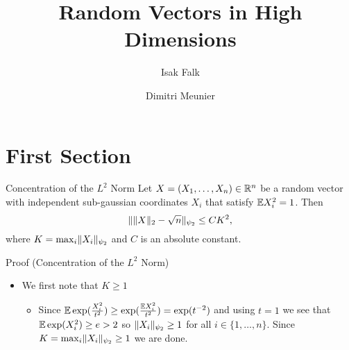 \documentclass{beamer}
\title{Random Vectors in High Dimensions}
\author{Isak Falk \and Dimitri Meunier}
\institute{IIT}
\begin{document}
  \maketitle
  \section{First Section}
  \begin{frame}{Concentration of the \(L^{2}\) Norm}
      Let \(X = (X_{1}, \dots, X_{n}) \in \mathbb{R}^{n}\) be a random vector with independent
      sub-gaussian coordinates \(X_{i}\) that satisfy \(\mathbb{E} X_{i}^{2} = 1\). Then
      \begin{equation}
        \lVert\lVert X\rVert_{2} - \sqrt{n}\rVert_{\psi_{2}} \leq CK^{2},
      \end{equation}
      where \(K = \max_{i} \lVert X_{i}\rVert_{\psi_{2}}\) and \(C\) is an absolute
      constant.
  \end{frame}

  \begin{frame}{Proof (Concentration of the \(L^{2}\) Norm)}
    \begin{itemize}
      \item We first note that \(K \geq 1\)\pause
        \begin{itemize}
          \item Since \(\mathbb{E} \exp(\frac{X_{i}^{2}}{t^{2}}) \geq \exp(\frac{\mathbb{E} X_{i}^{2}}{t^{2}}) = \exp(t^{-2})\)
     and using \(t = 1\) we see that \(\mathbb{E} \exp(X_{i}^{2}) \geq e > 2\) so
     \(\lVert X_{i}\rVert_{\psi_{2}} \geq 1\) for all \(i \in \{1, \dots, n\}\). Since
     \(K = \max_{i}\lVert X_{i}\rVert_{\psi_{2}} \geq 1\) we are done.
        \end{itemize}
    \end{itemize}

  \end{frame}
\end{document}
